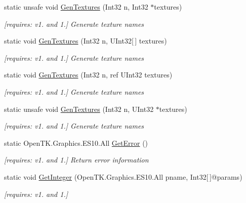 \begin{DoxyCompactItemize}
static unsafe void \hyperlink{class_open_t_k_1_1_graphics_1_1_e_s10_1_1_g_l_a5fc4a70a23938df34962b167c4932fa6}{Gen\-Textures} (Int32 n, Int32 $\ast$textures)
\begin{DoxyCompactList}\small\item\em \mbox{[}requires\-: v1. and 1.\mbox{]} Generate texture names \end{DoxyCompactList}\item 
static void \hyperlink{class_open_t_k_1_1_graphics_1_1_e_s10_1_1_g_l_aa28e04fa6c9d5b598f1f174808a19c81}{Gen\-Textures} (Int32 n, U\-Int32\mbox{[}$\,$\mbox{]} textures)
\begin{DoxyCompactList}\small\item\em \mbox{[}requires\-: v1. and 1.\mbox{]} Generate texture names \end{DoxyCompactList}\item 
static void \hyperlink{class_open_t_k_1_1_graphics_1_1_e_s10_1_1_g_l_afb78205cee1e3945ddb74d53f9200aca}{Gen\-Textures} (Int32 n, ref U\-Int32 textures)
\begin{DoxyCompactList}\small\item\em \mbox{[}requires\-: v1. and 1.\mbox{]} Generate texture names \end{DoxyCompactList}\item 
static unsafe void \hyperlink{class_open_t_k_1_1_graphics_1_1_e_s10_1_1_g_l_a155c0b2ab7dfc4d065fb0ab7d43e8e85}{Gen\-Textures} (Int32 n, U\-Int32 $\ast$textures)
\begin{DoxyCompactList}\small\item\em \mbox{[}requires\-: v1. and 1.\mbox{]} Generate texture names \end{DoxyCompactList}\item 
static Open\-T\-K.\-Graphics.\-E\-S10.\-All \hyperlink{class_open_t_k_1_1_graphics_1_1_e_s10_1_1_g_l_acd1cbb598c28eff3b661fe0dd7dbfad8}{Get\-Error} ()
\begin{DoxyCompactList}\small\item\em \mbox{[}requires\-: v1. and 1.\mbox{]} Return error information \end{DoxyCompactList}\item 
static void \hyperlink{class_open_t_k_1_1_graphics_1_1_e_s10_1_1_g_l_a5c0b1778c16bb4c6288227c19870e6a1}{Get\-Integer} (Open\-T\-K.\-Graphics.\-E\-S10.\-All pname, Int32\mbox{[}$\,$\mbox{]}@params)
\begin{DoxyCompactList}\small\item\em \mbox{[}requires\-: v1. and 1.\mbox{]}\end{DoxyCompactList}\item 

\end{DoxyCompactItemize}
